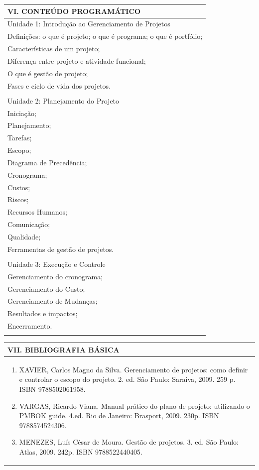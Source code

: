 \documentclass[12pt]{article}
\begin{document}
\begin{longtable}{|L{1.025\textwidth}|} \hline
%
{\bf VI. CONTEÚDO PROGRAMÁTICO } \\ \hline
Unidade 1: Introdução ao Gerenciamento de Projetos\\
Definições: o que é projeto; o que é programa; o que é portfólio;\\
Características de um projeto;\\
Diferença entre projeto e atividade funcional;\\
O que é gestão de projeto;\\ 
Fases e ciclo de vida dos projetos.\\
\\
Unidade 2: Planejamento do Projeto\\
Iniciação;\\ Planejamento;\\ Tarefas;\\ Escopo;\\ Diagrama de Precedência;\\ Cronograma;\\ Custos;\\ Riscos;\\Recursos Humanos;\\ Comunicação;\\ Qualidade;\\ Ferramentas de gestão de projetos.\\
\\
Unidade 3: Execução e Controle\\ Gerenciamento do cronograma;\\ Gerenciamento do Custo;\\ Gerenciamento de Mudanças;\\Resultados e impactos;\\ Encerramento.\\
\\
 \hline
\end{longtable} 





\begin{longtable}{|L{1.025\textwidth}|} \hline
%
{\bf VII. BIBLIOGRAFIA BÁSICA} \\ \hline
\begin{enumerate}
\item XAVIER, Carlos Magno da Silva. Gerenciamento de projetos: como definir e controlar o escopo do projeto. 2. ed. São Paulo: Saraiva, 2009. 259 p. ISBN 9788502061958.
\item VARGAS, Ricardo Viana. Manual prático do plano de projeto: utilizando o PMBOK guide. 4.ed. Rio de Janeiro: Brasport, 2009. 230p. ISBN 9788574524306.
\item MENEZES, Luís César de Moura. Gestão de projetos. 3. ed. São Paulo: Atlas, 2009. 242p. ISBN 9788522440405.
\end{enumerate}
 \\ \hline
\end{longtable}
\end{document}
